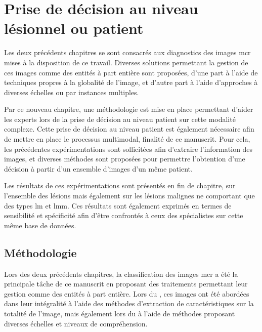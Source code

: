 \renewcommand{\thechapter}{\arabic{chapter}}
\setcounter{chapter}{6}

\chapter{Prise de décision au niveau lésionnel ou patient}
\label{chap:chapter_7}
\chapterintro
Les deux précédents chapitres se sont consacrés aux diagnostics des images \acrlong {mcr} mises à la disposition de ce travail. Diverses solutions permettant la gestion de ces images comme des entités à part entière sont proposées, d'une part à l'aide de techniques propres à la globalité de l'image, et d'autre part à l'aide d'approches à diverses échelles ou par instances multiples.\par

Par ce nouveau chapitre, une méthodologie est mise en place permettant d'aider les experts lors de la prise de décision au niveau patient sur cette modalité complexe. Cette prise de décision au niveau patient est également nécessaire afin de mettre en place le processus multimodal, finalité de ce manuscrit. Pour cela, les précédentes expérimentations sont sollicitées afin d'extraire l'information des images, et diverses méthodes sont proposées pour permettre l'obtention d'une décision à partir d'un ensemble d'images d'un même patient.\par

Les résultats de ces expérimentations sont présentés en fin de chapitre, sur l'ensemble des lésions mais également sur les lésions malignes ne comportant que des types \acrlong{lm} et \acrlong{lmm}. Ces résultats sont également exprimés en termes de sensibilité et spécificité afin d'être confrontés à ceux des spécialistes sur cette même base de données.\par
\newpage

\section{Méthodologie}
\label{sec:patient_decision_methodology}
Lors des deux précédents chapitres, la classification des images \gls{mcr} a été la principale tâche de ce manuscrit en proposant des traitements permettant leur gestion comme des entités à part entière. Lors du , ces images ont été abordées dans leur intégralité à l'aide des méthodes d'extraction de caractéristiques sur la totalité de l'image, mais également lors du  à l'aide de méthodes proposant diverses échelles et niveaux de compréhension.\par

